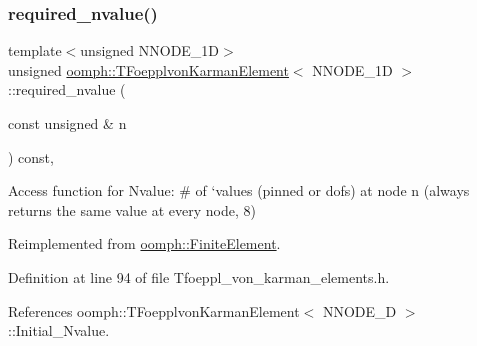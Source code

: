 \mbox{\label{classoomph_1_1TFoepplvonKarmanElement_a1d70b5c444369258453eb69e1e86d1e6}} 
\subsubsection{\texorpdfstring{required\+\_\+nvalue()}{required\_nvalue()}}
{\footnotesize\ttfamily template$<$unsigned N\+N\+O\+D\+E\+\_\+1D$>$ \\
unsigned \hyperlink{classoomph_1_1TFoepplvonKarmanElement}{oomph\+::\+T\+Foepplvon\+Karman\+Element}$<$ N\+N\+O\+D\+E\+\_\+1D $>$\+::required\+\_\+nvalue (\begin{DoxyParamCaption}\item[{const unsigned \&}]{n }\end{DoxyParamCaption}) const\hspace{0.3cm}{\ttfamily [inline]}, {\ttfamily [virtual]}}



Access function for Nvalue\+: \# of `values\textquotesingle{} (pinned or dofs) at node n (always returns the same value at every node, 8) 



Reimplemented from \hyperlink{classoomph_1_1FiniteElement_a56610c60d5bc2d7c27407a1455471b1a}{oomph\+::\+Finite\+Element}.



Definition at line 94 of file Tfoeppl\+\_\+von\+\_\+karman\+\_\+elements.\+h.



References oomph\+::\+T\+Foepplvon\+Karman\+Element$<$ N\+N\+O\+D\+E\+\_\+D $>$\+::\+Initial\+\_\+\+Nvalue.

\mbox{\label{classoomph_1_1TFoepplvonKarmanElement_a2b88b4d2198e38dde6debed69dceb004}} 
